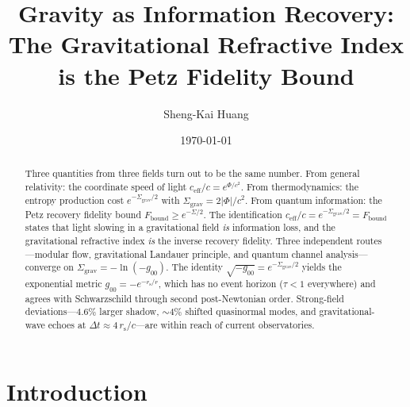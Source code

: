 \documentclass[prl,twocolumn,superscriptaddress,floatfix,nofootinbib]{revtex4-2}
\newcommand{\tauasym}{\tau}
\newcommand{\ceff}{c_{\mathrm{eff}}}
\newcommand{\rs}{r_{\mathrm{s}}}
\newcommand{\Sgrav}{\Sigma_{\mathrm{grav}}}
\newcommand{\Fbound}{F_{\mathrm{bound}}}
\begin{document}
\title{Gravity as Information Recovery:\\
The Gravitational Refractive Index is the Petz Fidelity Bound}

\author{Sheng-Kai Huang}

\date{\today}

\begin{abstract}
Three quantities from three fields turn out to be the same number.
From general relativity: the coordinate speed of light
$\ceff/c = e^{\Phi/c^2}$.
From thermodynamics: the entropy production cost
$e^{-\Sgrav/2}$ with $\Sgrav = 2|\Phi|/c^2$.
From quantum information: the Petz recovery fidelity bound
$\Fbound \geq e^{-\Sigma/2}$.
The identification $\ceff/c = e^{-\Sgrav/2} = \Fbound$
states that light slowing in a gravitational field \emph{is}
information loss, and the gravitational refractive index \emph{is}
the inverse recovery fidelity.
Three independent routes---modular flow, gravitational
Landauer principle, and quantum channel analysis---converge on
$\Sgrav = -\ln(-g_{00})$.
The identity $\sqrt{-g_{00}} = e^{-\Sgrav/2}$
yields the exponential metric $g_{00} = -e^{-\rs/r}$,
which has no event horizon ($\tauasym < 1$ everywhere)
and agrees with Schwarzschild through second
post-Newtonian order.
Strong-field deviations---$4.6\%$ larger shadow, $\sim 4\%$
shifted quasinormal modes, and gravitational-wave
echoes at $\Delta t \approx 4\,\rs/c$---are within reach of
current observatories.
\end{abstract}

\maketitle

\section{Introduction}
\end{document}
